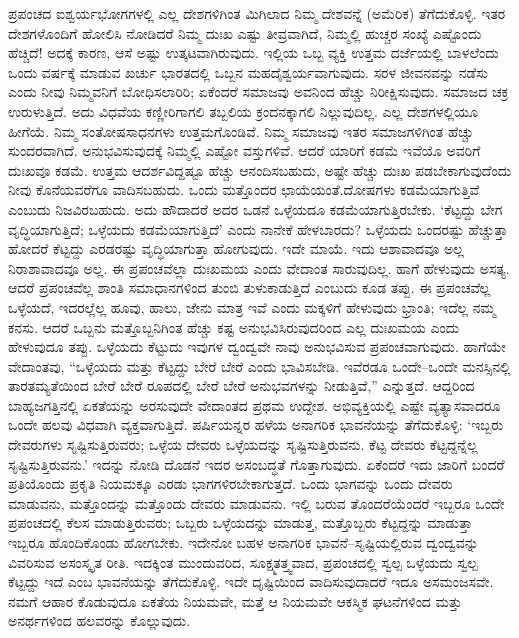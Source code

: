 ಪ್ರಪಂಚದ ಐಶ್ವರ್ಯಭೋಗಗಳಲ್ಲಿ ಎಲ್ಲ ದೇಶಗಳಿಗಿಂತ ಮಿಗಿಲಾದ ನಿಮ್ಮ ದೇಶವನ್ನೆ (ಅಮೆರಿಕ) ತೆಗೆದುಕೊಳ್ಳಿ. ಇತರ ದೇಶಗಳೊಂದಿಗೆ ಹೋಲಿಸಿ ನೋಡಿದರೆ ನಿಮ್ಮ ದುಃಖ ಎಷ್ಟು ತೀವ್ರವಾಗಿದೆ, ನಿಮ್ಮಲ್ಲಿ ಹುಚ್ಚರ ಸಂಖ್ಯೆ ಎಷ್ಟೊಂದು ಹೆಚ್ಚಿದೆ! ಅದಕ್ಕೆ ಕಾರಣ, ಆಸೆ ಅಷ್ಟು ಉತ್ಕಟವಾಗಿರುವುದು. ಇಲ್ಲಿಯ ಒಬ್ಬ ವ್ಯಕ್ತಿ ಉತ್ತಮ ದರ್ಜೆಯಲ್ಲಿ ಬಾಳಲೆಂದು ಒಂದು ವರ್ಷಕ್ಕೆ ಮಾಡುವ ಖರ್ಚು ಭಾರತದಲ್ಲಿ ಒಬ್ಬನ ಮಹದೈಶ್ವರ್ಯವಾಗುವುದು. ಸರಳ ಜೀವನವನ್ನು ನಡೆಸು ಎಂದು ನೀವು ನಿಮ್ಮವನಿಗೆ ಬೋಧಿಸಲಾರಿರಿ; ಏಕೆಂದರೆ ಸಮಾಜವು ಅವನಿಂದ ಹೆಚ್ಚು ನಿರೀಕ್ಷಿಸುವುದು. ಸಮಾಜದ ಚಕ್ರ ಉರುಳುತ್ತಿದೆ. ಅದು ವಿಧವೆಯ ಕಣ್ಣೀರಿಗಾಗಲಿ ತಬ್ಬಲಿಯ ಕ್ರಂದನಕ್ಕಾಗಲಿ ನಿಲ್ಲುವುದಿಲ್ಲ. ಎಲ್ಲ ದೇಶಗಳಲ್ಲಿಯೂ ಹೀಗೆಯೆ. ನಿಮ್ಮ ಸಂತೋಷಸಾಧನಗಳು ಉತ್ತಮಗೊಂಡಿವೆ. ನಿಮ್ಮ ಸಮಾಜವು ಇತರ ಸಮಾಜಗಳಿಗಿಂತ ಹೆಚ್ಚು ಸುಂದರವಾಗಿದೆ. ಅನುಭವಿಸುವುದಕ್ಕೆ ನಿಮ್ಮಲ್ಲಿ ಎಷ್ಟೋ ವಸ್ತುಗಳಿವೆ. ಆದರೆ ಯಾರಿಗೆ ಕಡಮೆ ಇವೆಯೊ ಅವರಿಗೆ ದುಃಖವೂ ಕಡಮೆ. ಉತ್ತಮ ಆದರ್ಶವಿದ್ದಷ್ಟೂ ಹೆಚ್ಚು ಆನಂದಿಸಬಹುದು, ಅಷ್ಟೇ ಹೆಚ್ಚು ದುಃಖ ಪಡಬೇಕಾಗುವುದೆಂದು ನೀವು ಕೊನೆಯವರೆಗೂ ವಾದಿಸಬಹುದು. ಒಂದು ಮತ್ತೊಂದರ ಛಾಯೆಯಂತೆ.\break ದೋಷಗಳು ಕಡಮೆಯಾಗುತ್ತಿವೆ ಎಂಬುದು ನಿಜವಿರಬಹುದು. ಅದು ಹೌದಾದರೆ ಅದರ ಒಡನೆ ಒಳ್ಳೆಯದೂ ಕಡಮೆಯಾಗುತ್ತಿರಬೇಕು. ‘ಕೆಟ್ಟದ್ದು ಬೇಗ ವೃದ್ಧಿಯಾಗುತ್ತಿದೆ; ಒಳ್ಳೆಯದು ಕಡಮೆಯಾಗುತ್ತಿದೆ’ ಎಂದು ನಾನೇಕೆ ಹೇಳಬಾರದು? ಒಳ್ಳೆಯದು ಒಂದರಷ್ಟು ಹೆಚ್ಚುತ್ತಾ ಹೋದರೆ ಕೆಟ್ಟದ್ದು ಎರಡರಷ್ಟು ವೃದ್ಧಿಯಾಗುತ್ತಾ ಹೋಗುವುದು. ಇದೇ ಮಾಯೆ. ಇದು ಆಶಾವಾದವೂ ಅಲ್ಲ ನಿರಾಶಾವಾದವೂ ಅಲ್ಲ. ಈ ಪ್ರಪಂಚವೆಲ್ಲಾ ದುಃಖಮಯ ಎಂದು ವೇದಾಂತ ಸಾರುವುದಿಲ್ಲ. ಹಾಗೆ ಹೇಳುವುದು ಅಸತ್ಯ. ಆದರೆ ಪ್ರಪಂಚವೆಲ್ಲ ಶಾಂತಿ ಸಮಾಧಾನಗಳಿಂದ ತುಂಬಿ ತುಳುಕಾಡುತ್ತಿದೆ ಎಂಬುದು ಕೂಡ ತಪ್ಪು. ಈ ಪ್ರಪಂಚವೆಲ್ಲ ಒಳ್ಳೆಯದೆ, ಇದರಲ್ಲೆಲ್ಲ ಹೂವು, ಹಾಲು, ಜೇನು ಮಾತ್ರ ಇವೆ ಎಂದು ಮಕ್ಕಳಿಗೆ ಹೇಳುವುದು ಭ್ರಾಂತಿ; ಇದೆಲ್ಲ ನಮ್ಮ ಕನಸು. ಆದರೆ ಒಬ್ಬನು ಮತ್ತೊಬ್ಬನಿಗಿಂತ ಹೆಚ್ಚು ಕಷ್ಟ ಅನುಭವಿಸಿರುವುದರಿಂದ ಎಲ್ಲ ದುಃಖಮಯ ಎಂದು ಹೇಳುವುದೂ ತಪ್ಪು. ಒಳ್ಳೆಯದು ಕೆಟ್ಟುದು ಇವುಗಳ ದ್ವಂದ್ವವೇ ನಾವು ಅನುಭವಿಸುವ ಪ್ರಪಂಚವಾಗುವುದು. ಹಾಗೆಯೇ ವೇದಾಂತವು, “ಒಳ್ಳೆಯದು ಮತ್ತು ಕೆಟ್ಟದ್ದು ಬೇರೆ ಬೇರೆ ಎಂದು ಭಾವಿಸಬೇಡಿ. ಇವೆರಡೂ ಒಂದೇ–ಒಂದೇ ಮನಸ್ಸಿನಲ್ಲಿ ತಾರತಮ್ಯತೆಯಿಂದ ಬೇರೆ ಬೇರೆ ರೂಪದಲ್ಲಿ ಬೇರೆ ಬೇರೆ ಅನುಭವಗಳನ್ನು ನೀಡುತ್ತಿವೆ,” ಎನ್ನುತ್ತದೆ. ಆದ್ದರಿಂದ ಬಾಹ್ಯಜಗತ್ತಿನಲ್ಲಿ ಏಕತೆಯನ್ನು ಅರಸುವುದೇ ವೇದಾಂತದ ಪ್ರಥಮ ಉದ್ದೇಶ. ಅಭಿವ್ಯಕ್ತಿಯಲ್ಲಿ ಎಷ್ಟೇ ವ್ಯತ್ಯಾಸವಾದರೂ ಒಂದೇ ಹಲವು ವಿಧವಾಗಿ ವ್ಯಕ್ತವಾಗುತ್ತಿದೆ. ಪರ್ಷಿಯನ್ನರ ಹಳೆಯ ಅನಾಗರಿಕ ಭಾವನೆಯನ್ನು ತೆಗೆದುಕೊಳ್ಳಿ: ‘ಇಬ್ಬರು ದೇವರುಗಳು ಸೃಷ್ಟಿಸುತ್ತಿರುವರು; ಒಳ್ಳೆಯ ದೇವರು ಒಳ್ಳೆಯದನ್ನು ಸೃಷ್ಟಿಸುತ್ತಿರುವನು. ಕೆಟ್ಟ ದೇವರು ಕೆಟ್ಟದ್ದನ್ನೆಲ್ಲ ಸೃಷ್ಟಿಸುತ್ತಿರುವನು.’ ಇದನ್ನು ನೋಡಿ ದೊಡನೆ ಇದರ ಅಸಂಬದ್ಧತೆ ಗೊತ್ತಾಗುವುದು. ಏಕೆಂದರೆ ಇದು ಜಾರಿಗೆ ಬಂದರೆ ಪ್ರತಿಯೊಂದು ಪ್ರಕೃತಿ ನಿಯಮಕ್ಕೂ ಎರಡು ಭಾಗಗಳಿರಬೇಕಾಗುತ್ತದೆ. ಒಂದು ಭಾಗವನ್ನು ಒಂದು ದೇವರು ಮಾಡುವನು, ಮತ್ತೊಂದನ್ನು ಮತ್ತೊಂದು ದೇವರು ಮಾಡುವನು. ಇಲ್ಲಿ ಬರುವ ತೊಂದರೆಯೆಂದರೆ ಇಬ್ಬರೂ ಒಂದೇ ಪ್ರಪಂಚದಲ್ಲಿ ಕೆಲಸ ಮಾಡುತ್ತಿರುವರು; ಒಬ್ಬರು ಒಳ್ಳೆಯದನ್ನು ಮಾಡುತ್ತ, ಮತ್ತೊಬ್ಬರು ಕೆಟ್ಟದ್ದನ್ನು ಮಾಡುತ್ತಾ ಇಬ್ಬರೂ ಹೊಂದಿಕೊಂಡು ಹೋಗಬೇಕು. ಇದೇನೋ ಬಹಳ ಅನಾಗರಿಕ ಭಾವನೆ–ಸೃಷ್ಟಿಯಲ್ಲಿರುವ ದ್ವಂದ್ವವನ್ನು ವಿವರಿಸುವ ಅಸಂಸ್ಕೃತ ರೀತಿ. ಇದಕ್ಕಿಂತ ಮುಂದುವರಿದ, ಸೂಕ್ಷ್ಮತತ್ತ್ವವಾದ, ಪ್ರಪಂಚದಲ್ಲಿ ಸ್ವಲ್ಪ ಒಳ್ಳೆಯದು ಸ್ವಲ್ಪ ಕೆಟ್ಟದ್ದು ಇದೆ ಎಂಬ ಭಾವನೆಯನ್ನು ತೆಗೆದುಕೊಳ್ಳಿ. ಇದೇ ದೃಷ್ಟಿಯಿಂದ ವಾದಿಸುವುದಾದರೆ ಇದೂ ಅಸಮಂಜಸವೇ. ನಮಗೆ ಆಹಾರ ಕೊಡುವುದೂ ಏಕತೆಯ ನಿಯಮವೇ, ಮತ್ತೆ ಆ ನಿಯಮವೇ ಆಕಸ್ಮಿಕ ಘಟನೆಗಳಿಂದ ಮತ್ತು ಅನರ್ಥಗಳಿಂದ ಹಲವರನ್ನು ಕೊಲ್ಲುವುದು.


